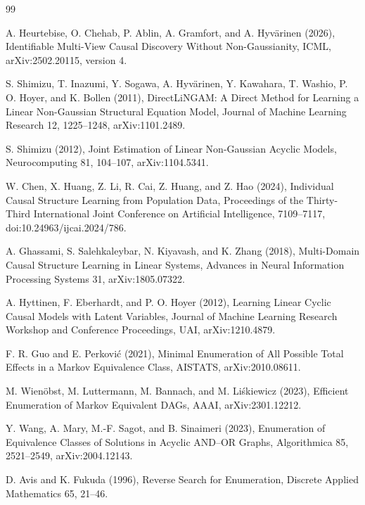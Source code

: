 \documentclass{article}
\begin{document}
\begin{thebibliography}{99}

   A. Heurtebise, O. Chehab, P. Ablin, A. Gramfort, and A. Hyvärinen (2026), Identifiable Multi-View Causal Discovery Without Non-Gaussianity, ICML, arXiv:2502.20115, version 4.

   S. Shimizu, T. Inazumi, Y. Sogawa, A. Hyvärinen, Y. Kawahara, T. Washio, P. O. Hoyer, and K. Bollen (2011), DirectLiNGAM: A Direct Method for Learning a Linear Non-Gaussian Structural Equation Model, Journal of Machine Learning Research 12, 1225--1248, arXiv:1101.2489.

   S. Shimizu (2012), Joint Estimation of Linear Non-Gaussian Acyclic Models, Neurocomputing 81, 104--107, arXiv:1104.5341.

   W. Chen, X. Huang, Z. Li, R. Cai, Z. Huang, and Z. Hao (2024), Individual Causal Structure Learning from Population Data, Proceedings of the Thirty-Third International Joint Conference on Artificial Intelligence, 7109--7117, doi:10.24963/ijcai.2024/786.

   A. Ghassami, S. Salehkaleybar, N. Kiyavash, and K. Zhang (2018), Multi-Domain Causal Structure Learning in Linear Systems, Advances in Neural Information Processing Systems 31, arXiv:1805.07322.

   A. Hyttinen, F. Eberhardt, and P. O. Hoyer (2012), Learning Linear Cyclic Causal Models with Latent Variables, Journal of Machine Learning Research Workshop and Conference Proceedings, UAI, arXiv:1210.4879.

   F. R. Guo and E. Perković (2021), Minimal Enumeration of All Possible Total Effects in a Markov Equivalence Class, AISTATS, arXiv:2010.08611.

   M. Wienöbst, M. Luttermann, M. Bannach, and M. Liśkiewicz (2023), Efficient Enumeration of Markov Equivalent DAGs, AAAI, arXiv:2301.12212.

   Y. Wang, A. Mary, M.-F. Sagot, and B. Sinaimeri (2023), Enumeration of Equivalence Classes of Solutions in Acyclic AND--OR Graphs, Algorithmica 85, 2521--2549, arXiv:2004.12143.

   D. Avis and K. Fukuda (1996), Reverse Search for Enumeration, Discrete Applied Mathematics 65, 21--46.


\end{thebibliography}
\end{document}
